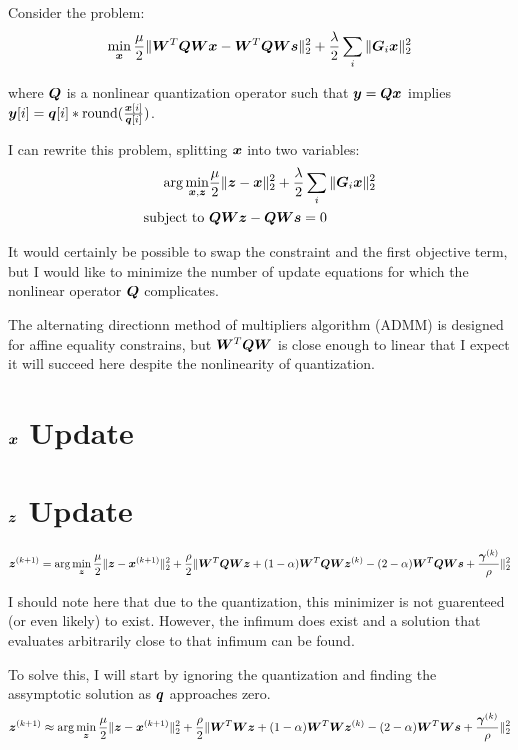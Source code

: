 \documentclass{article}
\begin{document}
Consider the problem:
\begin{equation}
\min_{\bm{x}} \frac{\mu}{2} \|\bm{W}^T\bm{Q}\bm{W}\bm{x} - \bm{W}^T\bm{Q}\bm{W}\bm{s}\|_2^2 + \frac{\lambda}{2}\sum_{i} \|\bm{G}_i\bm{x}\|_2^2 
\end{equation}

where $\bm{Q}$ is a nonlinear quantization operator such that $\bm{y} = \bm{Q}\bm{x}$ implies $\bm{y}[i] = \bm{q}[i]*\operatorname{round}(\frac{\bm{x}[i]}{\bm{q}[i]})$.

I can rewrite this problem, splitting $\bm{x}$ into two variables:
\begin{equation}
\begin{aligned}
\arg\min_{\bm{x},\bm{z}} & \frac{\mu}{2} \|\bm{z} - \bm{x}\|_2^2 + \frac{\lambda}{2}\sum_{i} \|\bm{G}_i\bm{x}\|_2^2 \\
\text{subject to } & \bm{Q}\bm{W}\bm{z} - \bm{Q}\bm{W}\bm{s} = 0
\end{aligned} 
\end{equation}

It would certainly be possible to swap the constraint and the first objective term, but I would like to minimize the number of update equations for which the nonlinear operator $\bm{Q}$ complicates.

The alternating directionn method of multipliers algorithm (ADMM) is designed for affine equality constrains, but $\bm{W}^T\bm{Q}\bm{W}$ is close enough to linear that I expect it will succeed here despite the nonlinearity of quantization.

\section{$\bm{x}$ Update}




\section{$\bm{z}$ Update}
\begin{equation}
\bm{z}^{(k + 1)} = \arg\min_{\bm{z}} \frac{\mu}{2} \|\bm{z} - \bm{x}^{(k + 1)}\|_2^2 + \frac{\rho}{2}\|\bm{W}^T\bm{Q}\bm{W}\bm{z} + (1 - \alpha)\bm{W}^T\bm{Q}\bm{W}\bm{z}^{(k)} - (2 - \alpha)\bm{W}^T\bm{Q}\bm{W}\bm{s} + \frac{\bm{\gamma}^{(k)}}{\rho}\|_2^2
\end{equation}

I should note here that due to the quantization, this minimizer is not guarenteed (or even likely) to exist.  However, the infimum does exist and a solution that evaluates arbitrarily close to that infimum can be found.  

To solve this, I will start by ignoring the quantization and finding the assymptotic solution as $\bm{q}$ approaches zero.
\begin{equation}
\bm{z}^{(k + 1)} \approx \arg\min_{\bm{z}} \frac{\mu}{2} \|\bm{z} - \bm{x}^{(k + 1)}\|_2^2 + \frac{\rho}{2}\|\bm{W}^T\bm{W}\bm{z} + (1 - \alpha)\bm{W}^T\bm{W}\bm{z}^{(k)} - (2 - \alpha)\bm{W}^T\bm{W}\bm{s} + \frac{\bm{\gamma}^{(k)}}{\rho}\|_2^2
\end{equation}
\end{document}
